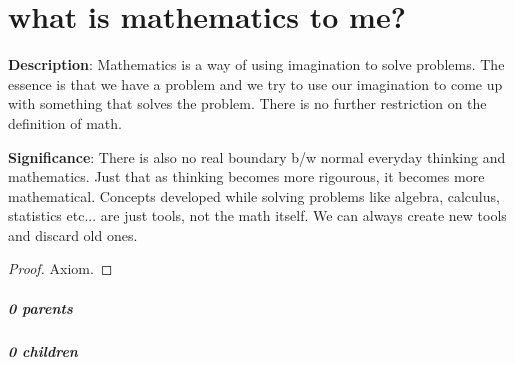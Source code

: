 \documentclass[./main.tex]{subfiles}
\begin{document}
\chapter{what is mathematics to me?}


\begin{statement}
\label{statement:Mathematics}\hspace*{0pt}\par
\end{statement}
\textbf{Description}:
Mathematics is a way of using imagination to solve problems.
The essence is that we have a problem and we try to use our imagination to come up with something that solves the problem.
There is no further restriction on the definition of math.
\par
{\color{magenta} \textbf{Significance}:
There is also no real boundary b/w normal everyday thinking and mathematics.
Just that as thinking becomes more rigourous, it becomes more mathematical.
Concepts developed while solving problems like algebra, calculus, statistics etc... are just tools, not the math itself.
We can always create new tools and discard old ones.
\par}
\begin{proof}Axiom.\end{proof}\par
\paragraph{0 parents} 
\paragraph{0 children} 
\end{document}

